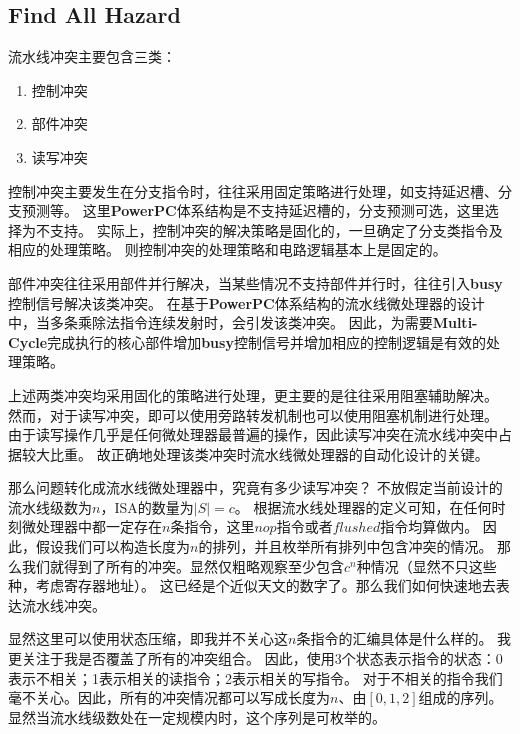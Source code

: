 \documentclass[hyperref,UTF8]{ctexart}
\theoremstyle{definition}
\theoremstyle{remark}
\numberwithin{equation}{subsection}
\newcommand{\Emph}{\textbf}
\begin{document}
\subsection{Find All Hazard}

	流水线冲突主要包含三类：
	\begin{enumerate}[(1)]
	
		\item 控制冲突
		
		\item 部件冲突
		
		\item 读写冲突
		
	\end{enumerate}
	
	控制冲突主要发生在分支指令时，往往采用固定策略进行处理，如支持延迟槽、分支预测等。
	这里\Emph{PowerPC}体系结构是不支持延迟槽的，分支预测可选，这里选择为不支持。
	实际上，控制冲突的解决策略是固化的，一旦确定了分支类指令及相应的处理策略。
	则控制冲突的处理策略和电路逻辑基本上是固定的。
	
	部件冲突往往采用部件并行解决，当某些情况不支持部件并行时，往往引入\Emph{busy}控制信号解决该类冲突。
	在基于\Emph{PowerPC}体系结构的流水线微处理器的设计中，当多条乘除法指令连续发射时，会引发该类冲突。
	因此，为需要\Emph{Multi-Cycle}完成执行的核心部件增加\Emph{busy}控制信号并增加相应的控制逻辑是有效的处理策略。
	
	上述两类冲突均采用固化的策略进行处理，更主要的是往往采用阻塞辅助解决。
	然而，对于读写冲突，即可以使用旁路转发机制也可以使用阻塞机制进行处理。
	由于读写操作几乎是任何微处理器最普遍的操作，因此读写冲突在流水线冲突中占据较大比重。
	故正确地处理该类冲突时流水线微处理器的自动化设计的关键。
	
	那么问题转化成流水线微处理器中，究竟有多少读写冲突？
	不放假定当前设计的流水线级数为$n$，ISA的数量为$|S| = c$。
	根据流水线处理器的定义可知，在任何时刻微处理器中都一定存在$n$条指令，这里$nop$指令或者$flushed$指令均算做内。
	因此，假设我们可以构造长度为$n$的排列，并且枚举所有排列中包含冲突的情况。
	那么我们就得到了所有的冲突。显然仅粗略观察至少包含$c^n$种情况（显然不只这些种，考虑寄存器地址）。
	这已经是个近似天文的数字了。那么我们如何快速地去表达流水线冲突。
	
	显然这里可以使用状态压缩，即我并不关心这$n$条指令的汇编具体是什么样的。
	我更关注于我是否覆盖了所有的冲突组合。
	因此，使用3个状态表示指令的状态：0表示不相关；1表示相关的读指令；2表示相关的写指令。
	对于不相关的指令我们毫不关心。因此，所有的冲突情况都可以写成长度为$n$、由$[0, 1 ,2]$组成的序列。
	显然当流水线级数处在一定规模内时，这个序列是可枚举的。
	
\end{document}
